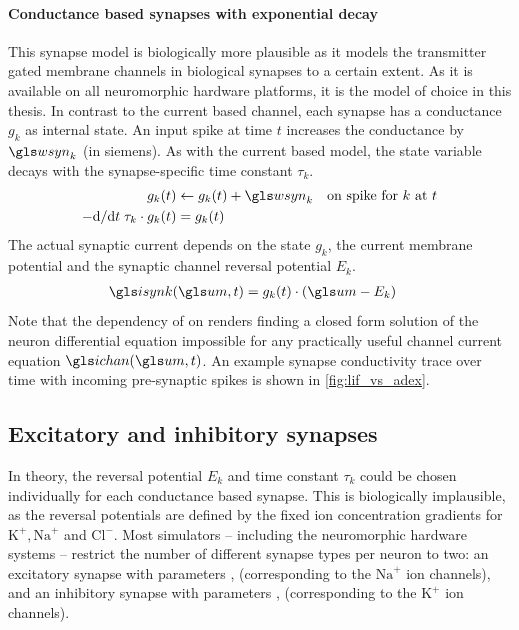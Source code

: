 \paragraph{Conductance based synapses with exponential decay}
This synapse model is biologically more plausible as it models the transmitter gated membrane channels in biological synapses to a certain extent. As it is available on all neuromorphic hardware platforms, it is the model of choice in this thesis. In contrast to the current based channel, each synapse has a conductance $g_k$ as internal state. An input spike at time $t$ increases the conductance by $\wsyn_k$ (in siemens). As with the current based model, the state variable decays with the synapse-specific time constant $\tau_k$.
\begin{align}
	g_k(t) &\gets g_k(t) + \wsyn_k \quad \text{on spike for $k$ at } t
	\label{eqn:conductance_based_sypase} \\
	- \mathrm{d}/\mathrm{d}t \; \tau_k \cdot g_k(t) &= g_k(t)
	\label{eqn:conductance_based_sypase_decay}
\end{align}
The actual synaptic current \isynk depends on the state $g_k$, the current membrane potential \um and the synaptic channel reversal potential $E_k$.
\begin{align}
	\isynk(\um, t) &= g_k(t) \cdot (\um - E_k)
	\label{eqn:conductance_based_current}
\end{align}
Note that the dependency of \isynk on \um renders finding a closed form solution of the neuron differential equation impossible for any practically useful channel current equation $\ichan(\um, t)$. An example synapse conductivity trace over time with incoming pre-synaptic spikes is shown in \cref{fig:lif_vs_adex}.

\subsection{Excitatory and inhibitory synapses}
\label{sec:excitatory_inhibitory_synapses}

In theory, the reversal potential $E_k$ and time constant $\tau_k$ could be chosen individually for each conductance based synapse. This is biologically implausible, as the reversal potentials are defined by the fixed ion concentration gradients for $\mathrm{K}^+, \mathrm{Na}^+$ and $\mathrm{Cl}^-$. Most simulators -- including the neuromorphic hardware systems -- restrict the number of different synapse types per neuron to two: an excitatory synapse with parameters \Ee, \TauE (corresponding to the $\mathrm{Na}^+$ ion channels), and an inhibitory synapse with parameters \Ei, \TauI (corresponding to the $\mathrm{K}^+$ ion channels).

